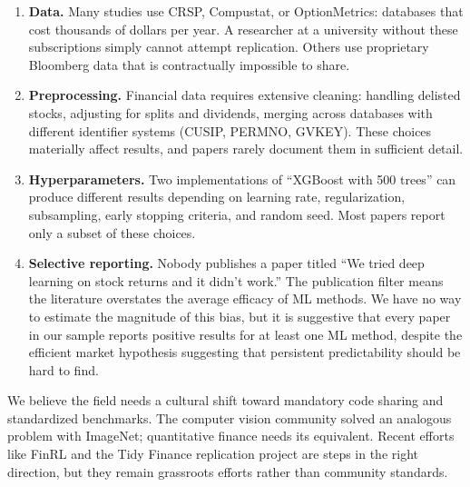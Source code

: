 \begin{enumerate}[leftmargin=*]
    \item \textbf{Data.} Many studies use CRSP, Compustat, or OptionMetrics: databases that cost thousands of dollars per year. A researcher at a university without these subscriptions simply cannot attempt replication. Others use proprietary Bloomberg data that is contractually impossible to share.

    \item \textbf{Preprocessing.} Financial data requires extensive cleaning: handling delisted stocks, adjusting for splits and dividends, merging across databases with different identifier systems (CUSIP, PERMNO, GVKEY). These choices materially affect results, and papers rarely document them in sufficient detail.

    \item \textbf{Hyperparameters.} Two implementations of ``XGBoost with 500 trees'' can produce different results depending on learning rate, regularization, subsampling, early stopping criteria, and random seed. Most papers report only a subset of these choices.

    \item \textbf{Selective reporting.} Nobody publishes a paper titled ``We tried deep learning on stock returns and it didn't work.'' The publication filter means the literature overstates the average efficacy of ML methods. We have no way to estimate the magnitude of this bias, but it is suggestive that every paper in our sample reports positive results for at least one ML method, despite the efficient market hypothesis suggesting that persistent predictability should be hard to find.
\end{enumerate}

We believe the field needs a cultural shift toward mandatory code sharing and standardized benchmarks. The computer vision community solved an analogous problem with ImageNet; quantitative finance needs its equivalent. Recent efforts like FinRL \citep{Wang2021} and the Tidy Finance replication project are steps in the right direction, but they remain grassroots efforts rather than community standards.

